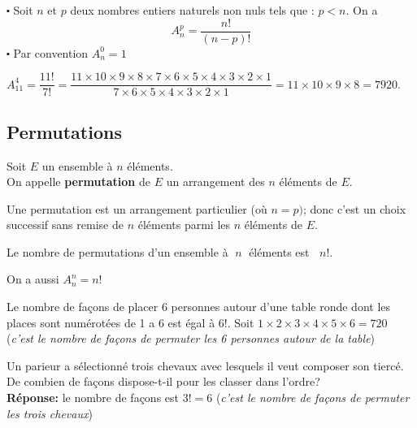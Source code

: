 \begin{property}
$ \centerdot $ Soit $ n$ et $p $ deux  nombres  entiers naturels  non nuls tels que : $ p< n $. On a  $$A_{n}^{p}= \dfrac{n!}{(n-p)!} $$
$ \centerdot $ Par convention $ A_{n}^{0}=1 $
\end{property}
\begin{example}

$A_{11}^{4}= \dfrac{11!}{7!}=\dfrac{11\times10\times9\times 8\times7\times6\times5\times4\times3\times2\times1}{7\times6\times5\times4\times3\times2\times1} =11\times 10\times 9 \times 8 =7920.  $
\end{example}
\subsection*{Permutations}
\begin{definition}
Soit $ E $ un ensemble à $ n $ éléments.\\
On appelle \textbf{permutation} de $ E $ un arrangement des $ n $ éléments de $ E. $
\end{definition}
Une permutation est un arrangement particulier (où $ n=p ) $; donc c'est un choix successif sans remise de $ n $ éléments  parmi les $ n $ éléments de $ E. $
\begin{property}
Le nombre de permutations d'un ensemble à $\; n \;$ éléments est $\;\; n!$.
 \end{property}
  
   On a aussi $A_{n}^{n}=n!$


 \begin{example} 

 Le nombre de façons de placer 6 personnes autour d'une table ronde  dont les places sont numérotées de 1 a 6 est égal à $ 6! $. 	Soit $ 1\times 2\times 3\times 4\times 5 \times 6= 720 $\; (\textit{c'est le nombre de façons de permuter les 6  personnes autour de la table})
 \end{example}
 
  \begin{example}

 Un parieur a sélectionné trois chevaux avec lesquels il veut composer son tiercé. De combien de façons  dispose-t-il pour les classer dans l'ordre? \\
 \textbf{Réponse:}  le nombre de façons est $ 3!= 6 $\; (\textit{c'est le nombre de façons de permuter les trois chevaux})
	 \end{example}
